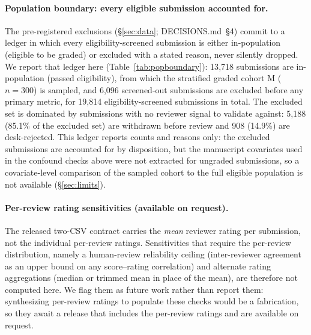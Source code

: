 \paragraph{Population boundary: every eligible submission accounted for.} The
pre-registered exclusions (\S\ref{sec:data}; DECISIONS.md~\S4) commit to a
ledger in which every eligibility-screened submission is either in-population
(eligible to be graded) or excluded with a stated reason, never silently
dropped. We report that ledger here (Table~\ref{tab:popboundary}):
13{,}718 submissions are in-population (passed eligibility), from which
the stratified graded cohort M ($n=300$) is sampled, and 6{,}096
screened-out submissions are excluded before any primary metric, for 19{,}814
eligibility-screened submissions in total. The excluded set is dominated by
submissions with no reviewer signal to validate against: 5{,}188
(85.1\% of the excluded set) are withdrawn before review and
908 (14.9\%) are desk-rejected. This ledger
reports counts and reasons only: the excluded submissions are accounted for by
disposition, but the manuscript covariates used in the confound checks above were
not extracted for ungraded submissions, so a covariate-level comparison of the
sampled cohort to the full eligible population is not available
(\S\ref{sec:limits}).

\begin{table}[h]
  \centering
  \caption{Population boundary: the in-population eligible set (and the graded
  cohort M sampled from it) beside the eligible-but-excluded ledger, broken down
  by exclusion reason. Every eligibility-screened submission is accounted for by
  disposition (DECISIONS.md~\S4); the ledger carries counts and reasons only, not
  manuscript covariates.}
  \label{tab:popboundary}
  
\end{table}

\paragraph{Per-review rating sensitivities (available on request).} The released
two-CSV contract carries the \emph{mean} reviewer rating per submission, not the
individual per-review ratings. Sensitivities that require the per-review
distribution, namely a human-review reliability ceiling (inter-reviewer agreement
as an upper bound on any score--rating correlation) and alternate rating
aggregations (median or trimmed mean in place of the mean), are therefore not
computed here.
We flag them as future work rather than report them: synthesizing per-review
ratings to populate these checks would be a fabrication, so they await a release
that includes the per-review ratings and are available on request.

